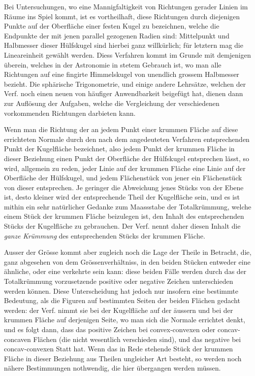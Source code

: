 \documentclass[fontsize=10pt,paper=a5,pagesize,headings=small,headinclude=true,footinclude=true]{scrbook}
\begin{document}
Bei Untersuchungen, wo eine Mannigfaltigkeit von Richtungen gerader Linien im Räume ins Spiel kommt, ist es vortheilhaft, diese Richtungen durch diejenigen Punkte auf der Oberfläche einer festen Kugel zu bezeichnen, welche die Endpunkte der mit jenen parallel gezogenen Radien sind: Mittelpunkt und Halbmesser dieser Hülfskugel sind hierbei ganz willkürlich; für letztern mag die Lineareinheit gewählt werden. Diess Verfahren kommt im Grunde mit demjenigen überein, welches in der Astronomie in stetem Gebrauch ist, wo man alle Richtungen auf eine fingirte Himmelskugel von unendlich grossem Halbmesser bezieht. Die sphärische Trigonometrie, und einige andere Lehrsätze, welchen der Verf. noch einen neuen von häufiger Anwendbarkeit beigefügt hat, dienen dann zur Auflösung der Aufgaben, welche die Vergleichung der verschiedenen vorkommenden Richtungen darbieten kann.

Wenn man die Richtung der an jedem Punkt einer krummen Fläche auf diese errichteten Normale durch den nach dem angedeuteten Verfahren entsprechenden Punkt der Kugelfläche bezeichnet, also jedem Punkt der krummen Fläche in dieser Beziehung einen Punkt der Oberfläche der Hülfskugel entsprechen lässt, so wird, allgemein zu reden, jeder Linie auf der krummen Fläche eine Linie auf der Oberfläche der Hülfskugel, und jedem Flächenstück von jener ein Flächenstück von dieser entsprechen. Je geringer die Abweichung jenes Stücks von der Ebene ist, desto kleiner wird der entsprechende Theil der Kugelfläche sein, und es ist mithin ein sehr natürlicher Gedanke zum Maassstabe der Totalkrümmung, welche einem Stück der krummen Fläche beizulegen ist, den Inhalt des entsprechenden Stücks der Kugelfläche zu gebrauchen. Der Verf. nennt daher diesen Inhalt die \textit{ganze Krümmung} des entsprechenden Stücks der krummen Fläche.

Ausser der Grösse kommt aber zugleich noch die Lage der Theile in Betracht, die, ganz abgesehen von dem Grössenverhältniss, in den beiden Stücken entweder eine ähnliche, oder eine verkehrte sein kann: diese beiden Fälle werden durch das der Totalkrümmung vorzusetzende positive oder negative Zeichen unterschieden werden können. Diese Unterscheidung hat jedoch nur insofern eine bestimmte Bedeutung, als die Figuren auf bestimmten Seiten der beiden Flächen gedacht werden: der Verf. nimmt sie bei der Kugelfläche auf der äussern und bei der krummen Fläche auf derjenigen Seite, wo man sich die Normale errichtet denkt, und es folgt dann, dass das positive Zeichen bei convex-convexen oder concav-concaven Flächen (die nicht wesentlich verschieden sind), und das negative bei concav-convexen Statt hat. Wenn das in Rede stehende Stück der krummen Fläche in dieser Beziehung aus Theilen ungleicher Art besteht, so werden noch nähere Bestimmungen nothwendig, die hier übergangen werden müssen.
\end{document}
